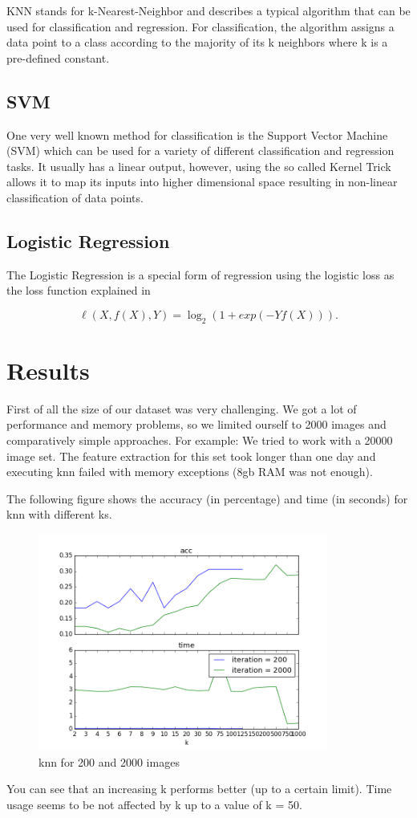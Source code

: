 KNN stands for k-Nearest-Neighbor and describes a typical algorithm that can be used for classification and regression. For classification, the algorithm assigns a data point to a class according to the majority of its k neighbors where k is a pre-defined constant.

\section{SVM}

One very well known method for classification is the Support Vector Machine (SVM) which can be used for a variety of different classification and regression tasks. It usually has a linear output, however, using the so called Kernel Trick allows it to map its inputs into higher dimensional space resulting in non-linear classification of data points.

\section{Logistic Regression}

The Logistic Regression is a special form of regression using the logistic loss as the loss function explained in \cite{logistic-loss}

\[\ell(X, f(X), Y) = \log_2(1 + exp(-Y f(X))).\]

\chapter{Results}\label{results}
First of all the size of our dataset was very challenging. We got a lot of performance and memory problems, so we limited ourself to 2000 images and comparatively simple approaches. For example: We tried to work with a 20000 image set. The feature extraction for this set  took longer than one day and executing knn failed with memory exceptions (8gb RAM was not enough).

The following figure shows the accuracy (in percentage) and time (in seconds) for knn with different ks. 
\begin{figure}[!htb]
	\includegraphics[width=0.85\textwidth]{images/knn}
	\caption{knn for 200 and 2000 images}
\end{figure}
You can see that an increasing k performs better (up to a certain limit). Time usage seems to be not affected by k up to a value of k = 50. 

